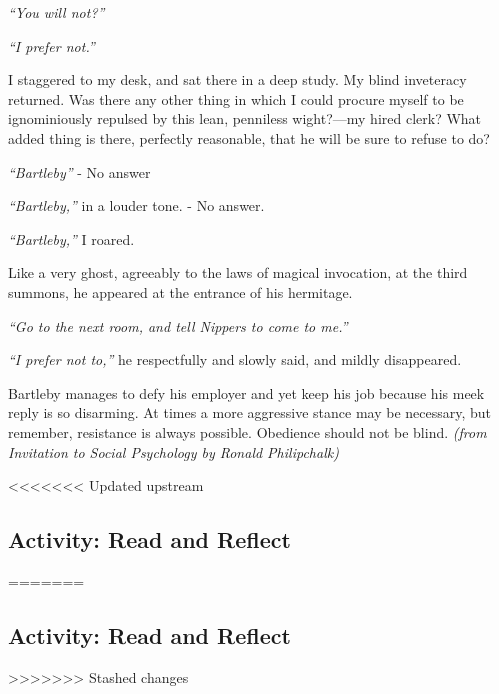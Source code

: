 \documentclass[
]{book}
\begin{document}
\emph{``You will not?''}

\emph{``I prefer not.''}

I staggered to my desk, and sat there in a deep study. My blind inveteracy returned. Was there any other thing in which I could procure myself to be ignominiously repulsed by this lean, penniless wight?---my hired clerk? What added thing is there, perfectly reasonable, that he will be sure to refuse to do?

\emph{``Bartleby''} - No answer

\emph{``Bartleby,''} in a louder tone. - No answer.

\emph{``Bartleby,''} I roared.

Like a very ghost, agreeably to the laws of magical invocation, at the third summons, he appeared at the entrance of his hermitage.

\emph{``Go to the next room, and tell Nippers to come to me.''}

\emph{``I prefer not to,''} he respectfully and slowly said, and mildly disappeared.

Bartleby manages to defy his employer and yet keep his job because his meek reply is so disarming. At times a more aggressive stance may be necessary, but remember, resistance is always possible. Obedience should not be blind. \emph{(from Invitation to Social Psychology by Ronald Philipchalk)}

<<<<<<< Updated upstream
\hypertarget{activity-read-and-reflect-7}{%
\subsection*{Activity: Read and Reflect}\label{activity-read-and-reflect-7}}
=======
\hypertarget{activity-read-and-reflect-6}{%
\subsection*{Activity: Read and Reflect}\label{activity-read-and-reflect-6}}
>>>>>>> Stashed changes
\end{document}
